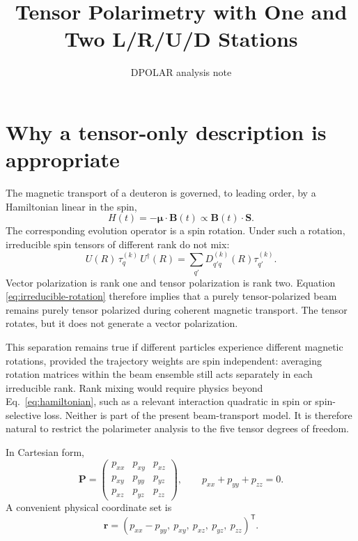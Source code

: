 \documentclass[11pt,a4paper]{article}
\title{Tensor Polarimetry with One and Two L/R/U/D Stations}
\author{DPOLAR analysis note}
\date{}
\newcommand{\Tens}{\bm P}
\newcommand{\vect}[1]{\bm{#1}}
\begin{document}
\maketitle

\section{Why a tensor-only description is appropriate}

The magnetic transport of a deuteron is governed, to leading order, by a
Hamiltonian linear in the spin,
\begin{equation}
 H(t)=-\vect\mu\cdot\vect B(t)\propto \vect B(t)\cdot\vect S.
 \label{eq:hamiltonian}
\end{equation}
The corresponding evolution operator is a spin rotation.  Under such a rotation,
irreducible spin tensors of different rank do not mix:
\begin{equation}
 U(R)\,\tau^{(k)}_q\,U^\dagger(R)
 =\sum_{q'}D^{(k)}_{q'q}(R)\tau^{(k)}_{q'}.
 \label{eq:irreducible-rotation}
\end{equation}
Vector polarization is rank one and tensor polarization is rank two.  Equation
\eqref{eq:irreducible-rotation} therefore implies that a purely tensor-polarized
beam remains purely tensor polarized during coherent magnetic transport.  The
tensor rotates, but it does not generate a vector polarization.

This separation remains true if different particles experience different
magnetic rotations, provided the trajectory weights are spin independent:
averaging rotation matrices within the beam ensemble still acts separately in
each irreducible rank.  Rank mixing would require physics
beyond Eq.~\eqref{eq:hamiltonian}, such as a relevant interaction quadratic in
spin or spin-selective loss.  Neither is part of the present beam-transport model.
It is therefore natural to restrict the polarimeter analysis to the five tensor
degrees of freedom.

In Cartesian form,
\begin{equation}
 \Tens=
 \begin{pmatrix}
 p_{xx}&p_{xy}&p_{xz}\\
 p_{xy}&p_{yy}&p_{yz}\\
 p_{xz}&p_{yz}&p_{zz}
 \end{pmatrix},\qquad
 p_{xx}+p_{yy}+p_{zz}=0.
 \label{eq:tensor}
\end{equation}
A convenient physical coordinate set is
\begin{equation}
 \vect r=(p_{xx}-p_{yy},\ p_{xy},\ p_{xz},\ p_{yz},\ p_{zz})^{\mathsf T}.
 \label{eq:physical-basis}
\end{equation}
\end{document}
